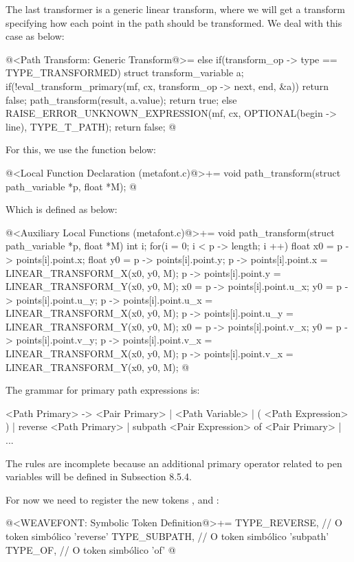 {{{{{The last transformer is a generic linear transform, where we will get
a transform specifying how each point in the path should be
transformed. We deal with this case as below:

\iniciocodigo
@<Path Transform: Generic Transform@>=
else if(transform_op -> type == TYPE_TRANSFORMED){
  struct transform_variable a;
  if(!eval_transform_primary(mf, cx, transform_op -> next, end, &a))
    return false;
  path_transform(result, a.value);
  return true;
}
else{
  RAISE_ERROR_UNKNOWN_EXPRESSION(mf, cx, OPTIONAL(begin -> line), TYPE_T_PATH);
  return false;
}
@
\fimcodigo

For this, we use the function below:

\iniciocodigo
@<Local Function Declaration (metafont.c)@>+=
void path_transform(struct path_variable *p, float *M);
@
\fimcodigo

Which is defined as below:

\iniciocodigo
@<Auxiliary Local Functions (metafont.c)@>+=
void path_transform(struct path_variable *p, float *M){
  int i;
  for(i = 0; i < p -> length; i ++){
    float x0 = p -> points[i].point.x;
    float y0 = p -> points[i].point.y;
    p -> points[i].point.x = LINEAR_TRANSFORM_X(x0, y0, M);
    p -> points[i].point.y = LINEAR_TRANSFORM_Y(x0, y0, M);
    x0 = p -> points[i].point.u_x;
    y0 = p -> points[i].point.u_y;
    p -> points[i].point.u_x = LINEAR_TRANSFORM_X(x0, y0, M);
    p -> points[i].point.u_y = LINEAR_TRANSFORM_Y(x0, y0, M);
    x0 = p -> points[i].point.v_x;
    y0 = p -> points[i].point.v_y;
    p -> points[i].point.v_x = LINEAR_TRANSFORM_X(x0, y0, M);
    p -> points[i].point.v_x = LINEAR_TRANSFORM_Y(x0, y0, M);
  }
}
@
\fimcodigo



The grammar for primary path expressions is:

\alinhaverbatim
<Path Primary> -> <Pair Primary> | <Path Variable> |
                  ( <Path Expression> ) |
                  reverse <Path Primary> |
                  subpath <Pair Expression> of <Pair Primary> |
                  ...
\alinhanormal

The rules are incomplete because an additional primary operator
related to pen variables will be defined in Subsection 8.5.4.

For now we need to register the new
tokens ,  and :

\iniciocodigo
@<WEAVEFONT: Symbolic Token Definition@>+=
TYPE_REVERSE,        // O token simbólico 'reverse'
TYPE_SUBPATH,        // O token simbólico 'subpath'
TYPE_OF,             // O token simbólico 'of'
@
\fimcodigo

}}}}}
